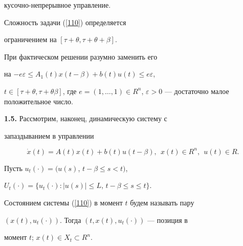 кусочно-непрерывное управление.





\begin{notes}


Сложность задачи (\ref{110}) определяется


ограничением на $[\tau+\theta,\tau+\theta+\beta]$.


При фактическом решении разумно заменить его


на $-e\varepsilon \le A_1(t)x(t-\beta)+b(t)u(t) \le e\varepsilon$,


$t \in [\tau+\theta, \tau+\theta\beta]$, где $e=(1, \dotsc, 1) \in


R^n$, $\varepsilon > 0$ --- достаточно малое положительное число.


\end{notes}





{\bf 1.5.} Рассмотрим, наконец, динамическую систему с


запаздыванием в управлении


$$




\Dot x (t) =A(t)x(t) +b(t)u(t-\beta),\ \ x(t) \in R^n,\ \ u(t) \in R.




$$





Пусть $u_t(\cdot)=(u(s)$, $t -\beta \le s<t)$,


$U_t(\cdot)=\{u_t(\cdot):|u(s)| \le L$, $t -\beta \le s \le t\}$.


Состоянием системы (\ref{110}) в момент $t$ будем называть пару


$(x(t), u_t(\cdot))$. Тогда $(t, x(t), u_t(\cdot))$ --- позиция в


момент $t$; $x(t) \in X_t \subset R^n$.





